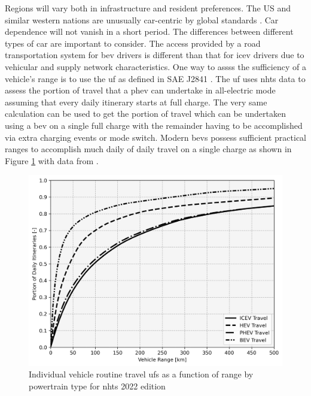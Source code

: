 Regions will vary both in infrastructure and resident preferences. The US and similar western nations are unusually car-centric by global standards  \cite{PrietoCuriel_2024}. Car dependence will not vanish in a short period. The differences between different types of car are important to consider. The access provided by a road transportation system for \gls{bev} drivers is different than that for \gls{icev} drivers due to vehicular and supply network characteristics. One way to assss the sufficiency of a vehicle's range is to use the \gls{uf} as defined in SAE J2841 \cite{SAE_J2481}. The \gls{uf} uses \gls{nhts} data to assess the portion of travel that a \gls{phev} can undertake in all-electric mode assuming that every daily itinerary starts at full charge. The very same calculation can be used to get the portion of travel which can be undertaken using a \gls{bev} on a single full charge with the remainder having to be accomplished via extra charging events or mode switch. Modern \glspl{bev} possess sufficient practical ranges to accomplish much daily of daily travel on a single charge as shown in Figure \ref{fig:utility_factors} with data from \cite{NHTS_2022}. 

\begin{figure}[H]
	\centering
	\includegraphics[width = \linewidth]{figs/UF_2022_km.png}
	\caption{Individual vehicle routine travel \glspl{uf} as a function of range by powertrain type for \gls{nhts} 2022 edition}
	\label{fig:utility_factors}
\end{figure}

